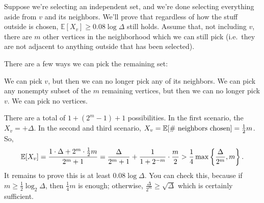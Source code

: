 \documentclass[11pt]{scrartcl}
\newcommand\EE{\mathbb E}
\begin{document}
Suppose we're selecting an independent set,
and we're done selecting everything aside from $v$ and its neighbors.
We'll prove that regardless of how the stuff outside is chosen, $\EE[X_v] \ge 0.08 \log \Delta$ still holds.
Assume that, not including $v$,
there are $m$ other vertices in the neighborhood which we can still pick (i.e.\ they
are not adjacent to anything outside that has been selected).

There are a few ways we can pick the remaining set:
\begin{itemize}
  \ii We can pick $v$, but then we can no longer pick any of its neighbors.
  \ii We can pick any nonempty subset of the $m$ remaining vertices, but then we can no longer pick $v$.
  \ii We can pick no vertices.
\end{itemize}
There are a total of $1 + \left( 2^m-1 \right) + 1$ possibilities.
In the first scenario, the $X_v = +\Delta$.
In the second and third scenario, $X_v = \EE[\text{\# neighbors chosen}] = \half m$.
So,
\[ \EE[X_v] = \frac{1 \cdot \Delta + 2^m \cdot \half m}{2^m+1}
  = \frac{\Delta}{2^m+1} + \frac{1}{1+2^{-m}} \cdot \frac{m}{2}
  > \frac14 \max \left\{ \frac{\Delta}{2^m}, m \right\}. \]
It remains to prove this is at least $0.08 \log \Delta$.
You can check this, because if $m \ge \frac 12 \log_2 \Delta$, then $\frac 14m$ is enough;
otherwise, $\frac{\Delta}{2^m} \ge \sqrt\Delta$ which is certainly sufficient.
\end{document}
